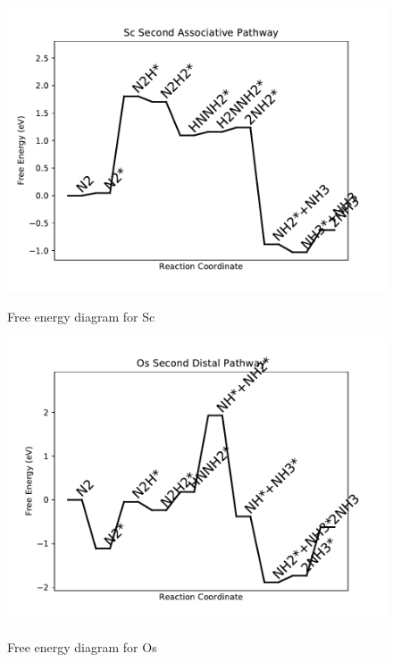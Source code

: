 \documentclass{article}
\begin{document}
\newpage
\begin{figure}
\includegraphics[width=1\linewidth]{data/plots/Sc_associative_2.pdf}
\label{fig:Sc_associative_2}
\caption{Free energy diagram for Sc}
\end{figure}

\begin{figure}
\includegraphics[width=1\linewidth]{data/plots/Os_distal_2.pdf}
\label{fig:Os_distal_2}
\caption{Free energy diagram for Os}
\end{figure}
\end{document}
